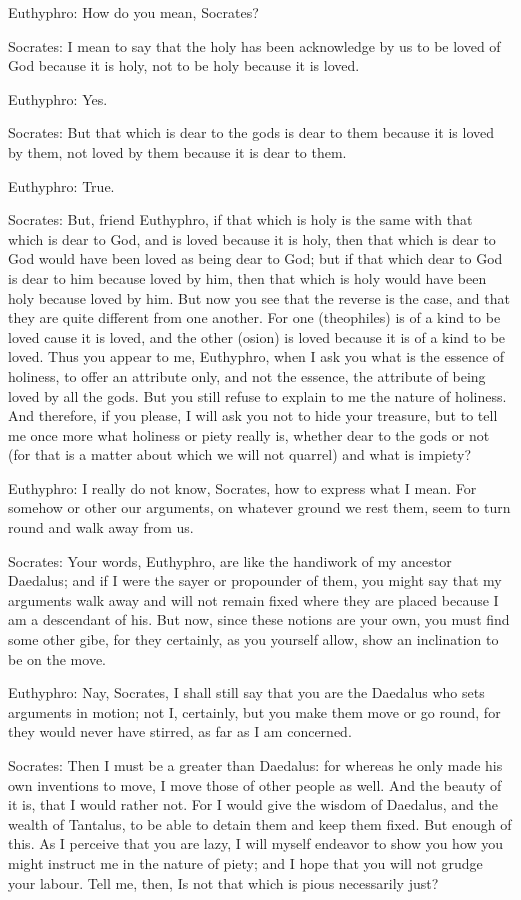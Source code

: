 Euthyphro: How do you mean, Socrates?

Socrates: I mean to say that the holy has been acknowledge by us to be loved of God because it is holy, not to be holy because it is loved.

Euthyphro: Yes.

Socrates: But that which is dear to the gods is dear to them because it is loved by them, not loved by them because it is dear to them.

Euthyphro: True.

Socrates: But, friend Euthyphro, if that which is holy is the same with that which is dear to God, and is loved because it is holy, then that which is dear to God would have been loved as being dear to God; but if that which dear to God is dear to him because loved by him, then that which is holy would have been holy because loved by him. But now you see that the reverse is the case, and that they are quite different from one another. For one (theophiles) is of a kind to be loved cause it is loved, and the other (osion) is loved because it is of a kind to be loved. Thus you appear to me, Euthyphro, when I ask you what is the essence of holiness, to offer an attribute only, and not the essence, the attribute of being loved by all the gods. But you still refuse to explain to me the nature of holiness. And therefore, if you please, I will ask you not to hide your treasure, but to tell me once more what holiness or piety really is, whether dear to the gods or not (for that is a matter about which we will not quarrel) and what is impiety?

Euthyphro: I really do not know, Socrates, how to express what I mean. For somehow or other our arguments, on whatever ground we rest them, seem to turn round and walk away from us.

Socrates: Your words, Euthyphro, are like the handiwork of my ancestor Daedalus; and if I were the sayer or propounder of them, you might say that my arguments walk away and will not remain fixed where they are placed because I am a descendant of his. But now, since these notions are your own, you must find some other gibe, for they certainly, as you yourself allow, show an inclination to be on the move.

Euthyphro: Nay, Socrates, I shall still say that you are the Daedalus who sets arguments in motion; not I, certainly, but you make them move or go round, for they would never have stirred, as far as I am concerned.

Socrates: Then I must be a greater than Daedalus: for whereas he only made his own inventions to move, I move those of other people as well. And the beauty of it is, that I would rather not. For I would give the wisdom of Daedalus, and the wealth of Tantalus, to be able to detain them and keep them fixed. But enough of this. As I perceive that you are lazy, I will myself endeavor to show you how you might instruct me in the nature of piety; and I hope that you will not grudge your labour. Tell me, then, Is not that which is pious necessarily just?

